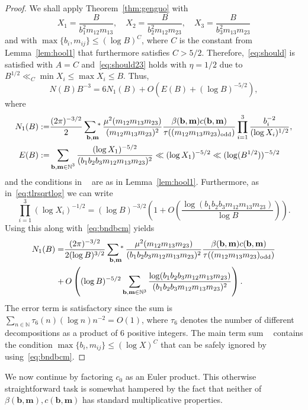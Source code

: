 \documentclass[a4paper,12pt,reqno]{amsart}
\numberwithin{equation}{section} \numberwithin{figure}{section}
\DeclareMathOperator*{\Osum}{\sum{}^*}
\newcommand\N{\mathbb{N}}
\renewcommand{\l}{\left}
\renewcommand{\r}{\right}
\renewcommand{\b}{\mathbf}
\renewcommand{\leq}{\leqslant}
\renewcommand{\#}{\sharp}
\theoremstyle{definition}
\numberwithin{lemma}{section}
\begin{document}
\begin{proof}We shall apply Theorem~\ref{thm:genguo} with 
$$
X_1=\frac{B}{ b_1^2 m_{12}m_{13}}, \quad
X_2=\frac{B}{ b_2^2  m_{12}m_{23} } , \quad
X_3=\frac{B}{ b_3^2  m_{13}m_{23} }
$$  and with $\max\{b_i,m_{ij}\}\leq (\log B)^C$, where $C$ is the constant from Lemma~\ref{lem:hool1}
that furthermore satisfies $C>5/2$. 
Therefore,~\eqref{eq:should} is satisfied with $A=C$ and~\eqref{eq:should23} holds with $\eta=1/2$
due to  
$ B^{1/2}\ll_C \min X_i \leq \max X_i \leq B $.
Thus,  
$$N(B) B^{-3} =6   N_1(B) + O(E(B)+(\log B)^{-5/2}),$$ 
where 
 \begin{align*}
N_1(B) :=
&\frac{ (2\pi )^{-3/2}}{2}
\Osum_{\b b,\b m }
  \frac{ \mu^2(m_{12} m_{13} m_{23}) }{ (  m_{12}m_{13}m_{23})^2}
 \frac{     \beta(\b b , \b m ) c(\b b , \b m )  }{    \tau(( m_{12}    m_{13} m_{23})_{\rm{odd}})   }
  \prod_{i=1}^3  \frac{b_i^{-2}}{ (\log X_i)^{1/2} }
,  \\
E(B)  :=
& \sum_{\substack{\b b , \b m \in  \N ^3  }}
  \frac{(\log X_1)^{-5/2}}{ (b_1b_2b_3 m_{12}m_{13}m_{23})^2}
\ll (\log X_1)^{-5/2}\ll (\log (B^{1/2}))^{-5/2}
\end{align*} 
and the conditions
in $\Osum$ are  as in 
Lemma~\ref{lem:hool1}.  
Furthermore, as in~\eqref{eq:tlrsqrtlog}
we can   write 
\[\prod_{i=1}^3 (\log X_i)^{-1/2}=
(\log B)^{-3/2} \l(1+O\l(\frac{\log (b_1b_2b_3 m_{12} m_{13} m_{23} )}{\log B}\r)\r)
.\] Using this along with~\eqref{eq:bndbcm} yields 
  \begin{align*}
N_1(B) =
&\frac{ (2\pi )^{-3/2}}{2(\log B)^{3/2}}
\Osum_{\b b,\b m }
  \frac{ \mu^2(m_{12} m_{13} m_{23}) }{ (  b_1b_2b_3m_{12}m_{13}m_{23})^2}
 \frac{     \beta(\b b , \b m ) c(\b b , \b m )  }{    \tau(( m_{12}    m_{13} m_{23})_{\rm{odd}})   }
   \\
+& \,O\l((\log B )^{-5/2}\sum_{\b b,\b m \in \N^3 }
  \frac{\log (b_1b_2b_3 m_{12} m_{13} m_{23} ) }{ ( b_1b_2b_3  m_{12}m_{13}m_{23})^2}
\r) .\end{align*}
The error term is satisfactory since  the sum is
$\sum_{n\in \N} \tau_6(n) (\log n) n^{-2} =O(1)$, where $\tau_6$ denotes the number of different decompositions 
as a product of $6$ positive integers. The main term sum $\Osum$ contains the condition $\max\{b_i,m_{ij}\} \leq (\log X)^C$
that can be safely ignored by using~\eqref{eq:bndbcm}.
\end{proof}
We now continue by factoring $c_0$ as an Euler product. This otherwise straightforward task is somewhat hampered by the fact that 
neither of   $ \beta(\b b , \b m ), c(\b b , \b m ) $ has standard  multiplicative properties.
\end{document}
